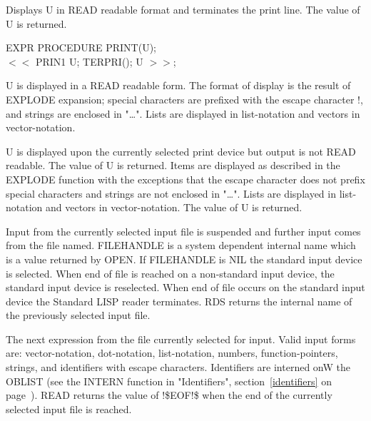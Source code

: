 {Displays U in READ readable format and terminates the print line. The
value of U is returned.

{\tt \begin{tabbing} EXPR PROCEDURE PRINT(U); \\
\hspace*{2em} $<<$ PRIN1 U; TERPRI(); U $>>$;
\end{tabbing}}}


{U is displayed in a READ readable form. The format of display is the
result of EXPLODE expansion; special characters are prefixed with the
escape character !, and strings are enclosed in "\ldots ". Lists are
displayed in list-notation and vectors in vector-notation. }


{U is displayed upon the currently selected print device but output is
not READ readable. The value of U is returned. Items are displayed as
described in the EXPLODE function with the exceptions that the escape
character does not prefix special characters and strings are not
enclosed in "\ldots ". Lists are displayed in list-notation and
vectors in vector-notation. The value of U is returned. }


{Input from the currently selected input file is suspended and further
input comes from the file named. FILEHANDLE is a system dependent
internal name which is a value returned by OPEN. If FILEHANDLE is NIL
the standard input device is selected. When end of file is reached on
a non-standard input device, the standard input device is reselected.
When end of file occurs on the standard input device the Standard LISP
reader terminates. RDS returns the internal name of the previously
selected input file.

}


{The next expression from the file currently selected for input. Valid
input forms are: vector-notation, dot-notation, list-notation,
numbers, function-pointers, strings, and identifiers with escape
characters. Identifiers are interned onW the OBLIST (see
 
the INTERN function in "Identifiers", section~\ref{identifiers} on
page~\pageref{identifiers}). READ returns the
value of !\$EOF!\$ when the end of the currently selected input file
is reached. }


